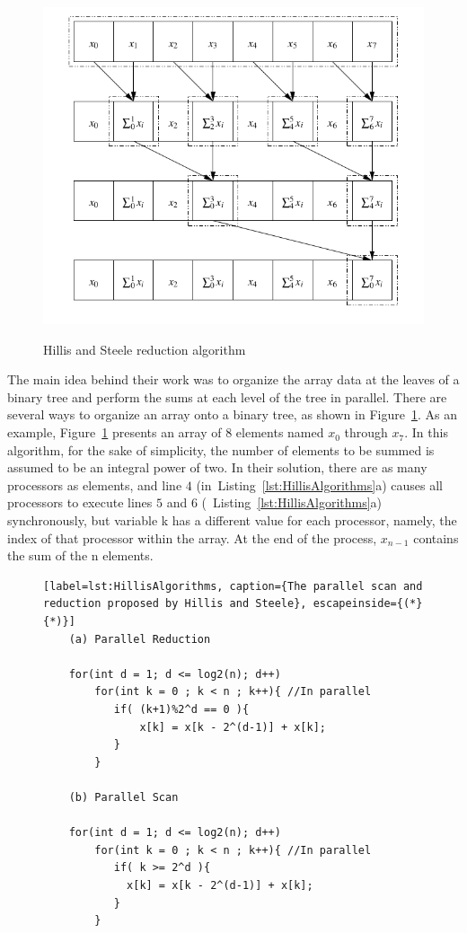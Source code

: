 \documentclass[Ingles]{ic-tese-v1}
\newcommand{\rfig}[1]{Figure~\ref{fig:#1}}
\newcommand{\rlsts}[2]{Listing~\ref{lst:#1}{#2}}
\begin{document}
	\begin{figure}[h]
		\centering
		\caption{Hillis and Steele reduction algorithm}
		\includegraphics[scale=0.5]{images/reduction.png}
		\label{fig:reductionhillis}
	\end{figure}
	 The main idea behind their work was to organize the array data at the leaves of a
binary tree and perform the sums at each level of the tree in parallel. There are several ways to organize an array onto a binary tree, as shown in  \rfig{reductionhillis}. As an example, \rfig{reductionhillis} presents an array of 8 elements named $x_{0}$ through $x_{7}$. In this algorithm, for the sake of simplicity, the number of elements to be summed is assumed to be an integral power of two. In their solution, there are as many processors as elements, and line $4$ (in~\rlsts{HillisAlgorithms}{a}) causes all processors to execute lines $5$ and $6$ (~\rlsts{HillisAlgorithms}{a}) synchronously, but variable k has a different value for each processor, namely, the index of that processor within the array. At the end of the process, $x_{n-1}$ contains the sum of the n elements.


\begin{figure}[t]
	\lstset{basicstyle=\scriptsize}
	\begin{lstlisting}[label=lst:HillisAlgorithms, caption={The parallel scan and reduction proposed by Hillis and Steele}, escapeinside={(*}{*)}]
	(a) Parallel Reduction

	for(int d = 1; d <= log2(n); d++)
	    for(int k = 0 ; k < n ; k++){ //In parallel
	       if( (k+1)%2^d == 0 ){
	           x[k] = x[k - 2^(d-1)] + x[k];
	       }
	    }

	(b) Parallel Scan

	for(int d = 1; d <= log2(n); d++)
	    for(int k = 0 ; k < n ; k++){ //In parallel
	       if( k >= 2^d ){
	         x[k] = x[k - 2^(d-1)] + x[k];
	       }
	    }

	\end{lstlisting}
\end{figure}
\end{document}
